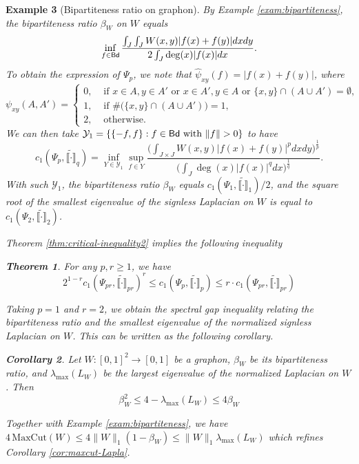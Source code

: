 \documentclass[12pt,a4paper]{article}
\newtheorem{theorem}{Theorem}[section]
\newtheorem{corollary}[theorem]{Corollary}
\newtheorem{example}[theorem]{Example}
\begin{document}
\begin{example}[Bipartiteness ratio on graphon]
By Example \ref{exam:bipartiteness}, the bipartiteness ratio $\beta_W$ on $W$ equals $$\inf_{f\in {\sf Bd}}
\frac{\int_J\int_JW(x,y)|f(x)+f(y)|dxdy}{2\int_J\deg(x)|f(x)|dx}.$$ 
To obtain the expression of $\Psi_p$, we note that $\widehat{\psi}_{xy}(f)=|f(x)+f(y)|$, where 
$$\psi_{xy}(A,A')=\begin{cases}
0,&\text{ if } x\in A,y\in A'\text{ or }x\in A',y\in A\text{ or }\{x,y\}\cap (A\cup A')=\emptyset,\\
1,&\text{ if }\#\big(\{x,y\}\cap (A\cup A')\big)=1,\\
2,&\text{ otherwise}.
\end{cases}
$$
We can then take $\mathcal{Y}_1=\{\{-f,f\}:f\in \Bd\text{ with }\|f\|>0\}$ to have 
$$c_1(\Psi_p,\widetilde{\llbracket \cdot\rrbracket}_q)=\inf\limits_{Y\in \mathcal{Y}_1}\sup\limits_{f\in Y} \frac{\Big(\int_{J\times J}W(x,y)|f(x)+f(y)|^pdxdy\Big)^{\frac1p} }{\big(\int_J \deg(x)|f(x)|^qdx\big)^{\frac1q}}.$$
With such $\mathcal{Y}_1$,  
the bipartiteness ratio $\beta_W$ equals $c_1(\Psi_1,\widetilde{\llbracket \cdot\rrbracket}_1)/2$, and the square root of the smallest eigenvalue of the signless Laplacian on $W$ is equal to $c_1(\Psi_2,\widetilde{\llbracket \cdot\rrbracket}_2)$. %



Theorem \ref{thm:critical-inequality2} implies the following inequality 
\begin{theorem}\label{thm:Cheeger-graphon-dua}
For any $p,r\ge1$, we have \begin{equation}\label{eq:p-Cheeger-dual}
2^{1-r}c_1(\Psi_{pr},\widetilde{\llbracket \cdot\rrbracket}_{pr})^r\le c_1(\Psi_p,\widetilde{\llbracket \cdot\rrbracket}_p)\le r\cdot c_1(\Psi_{pr},\widetilde{\llbracket \cdot\rrbracket}_{pr})    
\end{equation}    
\end{theorem}

Taking $p=1$ and $r=2$, we obtain the spectral gap inequality relating the bipartiteness ratio and the smallest eigenvalue of the normalized signless Laplacian on $W$. This can be written as the following corollary. 
\begin{corollary}
Let $W:[0,1]^2\to[0,1]$ be a graphon, $\beta_W$ be its bipartiteness ratio, and $\lambda_{\max}(L_W)$ be the largest eigenvalue of the normalized Laplacian on $W$. Then
$$ \beta_W^2\le 4-\lambda_{\max}(L_W) \le 4\beta_W$$
\end{corollary}
Together with Example \ref{exam:bipartiteness}, we have $4\,\text{MaxCut}(W)\le 4\|W\|_1(1-\beta_W)\le \|W\|_1\lambda_{\max}(L_W)$ which refines Corollary \ref{cor:maxcut-Lapla}.
\end{example}
\end{document}
